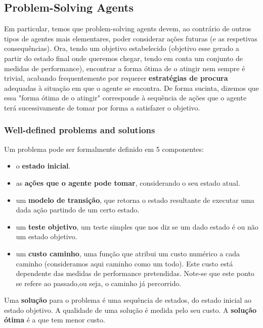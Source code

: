 \documentclass[11pt]{article}
\begin{document}
\subsection{Problem-Solving Agents}

Em particular, temos que problem-solving agents devem, ao contrário de outros tipos de agentes mais elementares, poder considerar ações futuras (e as respetivas consequências). Ora, tendo um objetivo estabelecido (objetivo esse gerado a partir do estado final onde queremos chegar, tendo em conta um conjunto de medidas de performance), encontrar a forma ótima de o atingir nem sempre é trivial, acabando frequentemente por requerer \textbf{estratégias de procura} adequadas à situação em que o agente se encontra. De forma sucinta, dizemos que essa "forma ótima de o atingir" corresponde à sequência de ações que o agente terá sucessivamente de tomar por forma a satisfazer o objetivo.

\subsubsection{Well-defined problems and solutions}

Um problema pode ser formalmente definido em 5 componentes:
\begin{itemize}[topsep=4pt,itemsep=0pt]
    \item o \textbf{estado inicial}.
    \item as \textbf{ações que o agente pode tomar}, considerando o seu estado atual.
    \item um \textbf{modelo de transição}, que retorna o estado resultante de executar uma dada ação partindo de um certo estado.
    \item um \textbf{teste objetivo}, um teste simples que nos diz se um dado estado é ou não um estado objetivo. 
    \item um \textbf{custo caminho}, uma função que atribui um custo numérico a cada caminho (consideramos aqui caminho como um todo). Este custo está dependente das medidas de performance pretendidas. Note-se que este ponto se refere ao passado,ou seja, o caminho já percorrido.
\end{itemize}\vspace{4pt}

Uma \textbf{solução} para o problema é uma sequência de estados, do estado inicial ao estado objetivo. A qualidade de uma solução é medida pelo seu custo. A \textbf{solução ótima} é a que tem menor custo.

\setcounter{subsection}{2}
\end{document}
